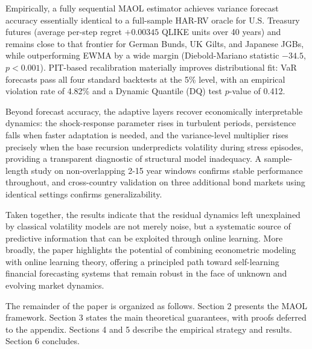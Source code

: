Empirically, a fully sequential MAOL estimator achieves variance forecast accuracy essentially identical to a full-sample HAR-RV oracle for U.S. Treasury futures (average per-step regret $+0.00345$ QLIKE units over 40 years) and remains close to that frontier for German Bunds, UK Gilts, and Japanese JGBs, while outperforming EWMA by a wide margin (Diebold-Mariano statistic $-34.5$, $p < 0.001$). PIT-based recalibration materially improves distributional fit: VaR forecasts pass all four standard backtests at the 5\% level, with an empirical violation rate of 4.82\% and a Dynamic Quantile (DQ) test $p$-value of 0.412.

Beyond forecast accuracy, the adaptive layers recover economically interpretable dynamics: the shock-response parameter rises in turbulent periods, persistence falls when faster adaptation is needed, and the variance-level multiplier rises precisely when the base recursion underpredicts volatility during stress episodes, providing a transparent diagnostic of structural model inadequacy. A sample-length study on non-overlapping 2-15 year windows confirms stable performance throughout, and cross-country validation on three additional bond markets using identical settings confirms generalizability.

Taken together, the results indicate that the residual dynamics left unexplained by classical volatility models are not merely noise, but a systematic source of predictive information that can be exploited through online learning. More broadly, the paper highlights the potential of combining econometric modeling with online learning theory, offering a principled path toward self-learning financial forecasting systems that remain robust in the face of unknown and evolving market dynamics.

The remainder of the paper is organized as follows. Section 2 presents the MAOL framework.
Section 3 states the main theoretical guarantees, with proofs deferred to the appendix. Sections 4 and 5 describe the empirical strategy and results. Section 6 concludes.